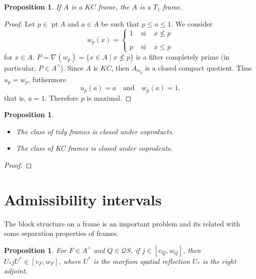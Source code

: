 \documentclass[11pt]{amsart}
\DeclareMathOperator{\pt}{pt}
\theoremstyle{plain}
\newtheorem{prop}[thm]{Proposition}
\theoremstyle{definition}
\begin{document}
\begin{prop}\label{KCT1}
If $A$ is a $KC$ frame, the $A$ is a $T_1$ frame.
\end{prop}

\begin{proof}
Let $p\in \pt A$ and $a\in A$ be such that $p\leq a\leq 1$. We consider 
\[
w_p(x)=\left\{\begin{array}{lcc}
1 & \mbox{ si } & x\nleq p\\
\\
p & \mbox{ si } & x\leq p
\end{array}\right.
\]
for $x\in A$. $P=\nabla(w_p)=\{x\in A\mid x\nleq p\}$ is a filter completely prime (in particular, $P\in A^\wedge$). Since $A$ is $KC$, then $A_{w_p}$ is a closed compact quotient. Thus $u_p=w_p$, futhermore
\[
u_p(a)=a\quad \mbox{and}\quad w_p(a)=1.
\]
that is, $a=1$. Therefore $p$ is maximal. 
\end{proof}

\begin{prop}\label{coprod}
\begin{itemize}
	The following holds:
\item[(1)] The class of tidy frames is closed under coproducts.
\item[(2)] The class of KC frames is closed under coprodcuts. 
\end{itemize}	
\end{prop}

\begin{proof}

\end{proof}








\section{Admissibility intervals}

The block structure on a frame is an important problem and its related with some separation properties of frames.
\begin{prop}\label{morfismo}
For $F\in A^\wedge$ and $Q\in\mathcal{Q}S$, if $j\in [v_Q, w_Q]$, then $U_*jU^*\in [v_F, w_F]$, where $U^*$ is the morfism spatial reflection $U_*$ is the right adjoint.
\end{prop}
\end{document}
